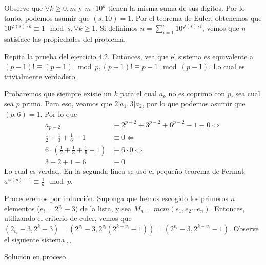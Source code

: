 \begin{sol}
	Observe que $\forall k \geq 0, m $ y $ m\cdot 10^{k}$ tienen la misma suma de sus d\'igitos. Por lo tanto, podemos asumir que $(s, 10) = 1$. Por el teorema de Euler, obtenemos que $10^{\varphi(s)\cdot k } \equiv 1 \mod s, \forall k \geq 1$. Si definimos $n = \sum_{i=1}^{s} 10^{\varphi(s) \cdot i}$, vemos que $n$ satisface las propiedades del problema.
\end{sol}

\begin{sol}
	Repita la prueba del ejercicio 4.2. Entonces, vea que el sistema es equivalente a $(p-1)! \equiv (p-1) \mod p, (p-1)! \equiv p-1 \mod (p-1)$. Lo cual es trivialmente verdadero.
\end{sol}

\begin{sol}
	Probaremos que siempre existe un $k$ para el cual $a_{k}$ no es coprimo con $p$, sea cual sea $p$ primo. Para eso, veamos que $2|a_{1}, 3|a_{2}$, por lo que podemos asumir que $(p, 6) = 1$. Por lo que 
	\begin{align}
	a_{p-2} &\equiv 2^{p-2} + 3^{p-2} + 6^{p-2} -1 \equiv 0 \iff \\
	\frac{1}{2}+\frac{1}{3}+\frac{1}{6}-1 &\equiv 0 \iff \\
	6 \cdot ( \frac{1}{2}+\frac{1}{3}+\frac{1}{6}-1) &\equiv 6 \cdot 0 \iff \\
	3 + 2 + 1 - 6 &\equiv 0
	\end{align}
	Lo cual es verdad. En la segunda l\'inea se us\'o el pequeño teorema de Fermat: $a^{\varphi(p)-1} \equiv \frac{1}{a} \mod p$.
\end{sol}

\begin{sol}
	Procederemos por inducci\'on. Suponga que hemos escogido los primeros $n$ elementos ($e_{i} = 2 ^{v_{i}} - 3$) de la lista, y sea $M_{n} = mcm(e_{1}, e_{2} \cdots e_{n})$. Entonces, utilizando el criterio de euler, vemos que $(2_{v_{i}}-3, 2^{k}-3) = (2^{v_{i}}-3, 2^{v_{i}}(2^{k-v_{i}}-1)) = (2^{v_{i}}-3, 2^{k-v_{i}}-1)$. Observe el siguiente sistema $_{\cdots}$
\end{sol}

\begin{sol}
	Solucion en proceso.
\end{sol}

